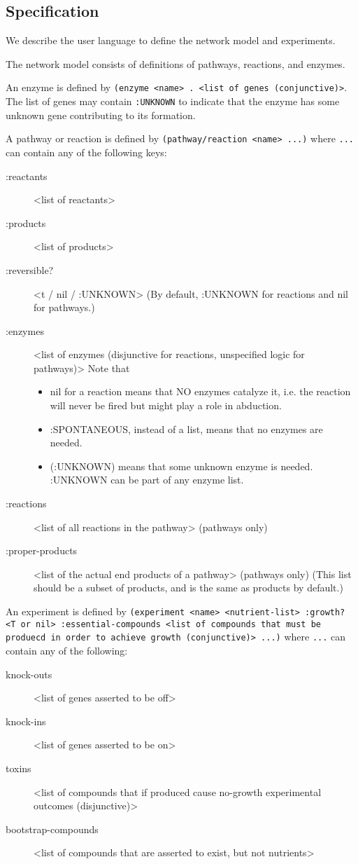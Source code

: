 \subsection{Specification}
\label{sec:spec}

We describe the user language to define the network model and experiments.

The network model consists of definitions of pathways, reactions, and enzymes.

An enzyme is defined by {\small\tt (enzyme <name> . <list of genes
(conjunctive)>}. The list of genes may contain {\small\tt :UNKNOWN} to
indicate that the enzyme has some unknown gene contributing to its
formation.

A pathway or reaction is defined by
{\small\tt (pathway/reaction <name> ...)} where {\small\tt ...} can contain any of the following keys:
\begin{description}
\item[:reactants] <list of reactants>
\item[:products] <list of products>
\item[:reversible?] <t / nil / :UNKNOWN> (By default, :UNKNOWN for reactions and nil for pathways.)
\item[:enzymes] <list of enzymes (disjunctive for reactions, unspecified logic for pathways)>
Note that
\begin{itemize}
\item nil for a reaction means that NO enzymes catalyze it, i.e. the reaction will never be fired but might play a role in abduction.
\item :SPONTANEOUS, instead of a list, means that no enzymes are needed.
\item (:UNKNOWN) means that some unknown enzyme is needed. :UNKNOWN can be part of any enzyme list.
\end{itemize}
\item[:reactions] <list of all reactions in the pathway> (pathways only)
\item[:proper-products] <list of the actual end products of a pathway> (pathways only) (This list should be a subset of products, and is the same as products by default.)
\end{description}

An experiment is defined by {\small\tt (experiment <name>
<nutrient-list> :growth? <T or nil> :essential-compounds <list of
compounds that must be produecd in order to achieve growth
(conjunctive)> ...)} where {\small\tt ...} can contain any of the
following:
\begin{description}
\item[knock-outs] <list of genes asserted to be off>
\item[knock-ins] <list of genes asserted to be on>
\item[toxins] <list of compounds that if produced cause no-growth experimental outcomes (disjunctive)>
\item[bootstrap-compounds] <list of compounds that are asserted to exist, but not nutrients>
\end{description}

